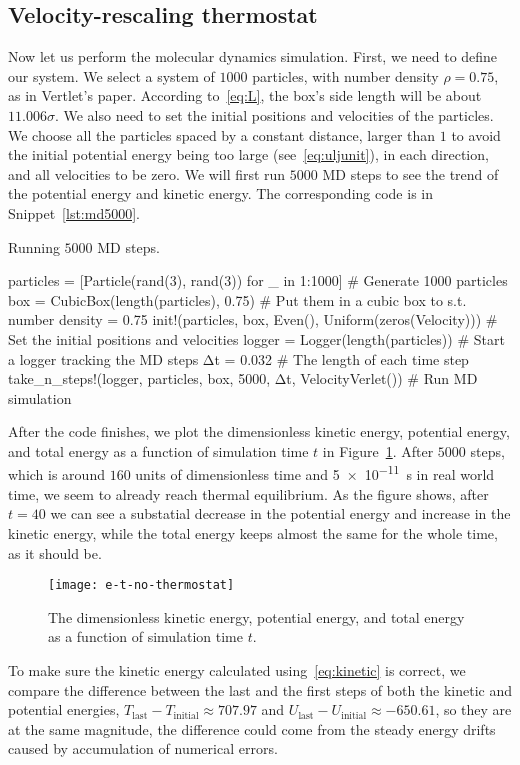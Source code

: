\subsection{Velocity-rescaling thermostat}

Now let us perform the molecular dynamics simulation.
First, we need to define our system. We select a system of $1000$ particles,
with number density $\rho = 0.75$, as in Vertlet\cite{Verlet}'s paper.
According to~\eqref{eq:L}, the box's side length will be about $11.006 \sigma$.
We also need to set the initial positions and velocities of the particles.
We choose all the particles spaced by a constant distance, larger than $1$
to avoid the initial potential energy being too large (see~\eqref{eq:uljunit}),
in each direction, and all velocities to be zero.
We will first run $5000$ MD steps to see the trend of the potential energy
and kinetic energy.
The corresponding code is in Snippet~\ref{lst:md5000}.
%
\begin{algorithm}
    \caption{Running $5000$ MD steps.}
    \label{lst:md5000}
    \begin{juliacode}
        particles = [Particle(rand(3), rand(3)) for _ in 1:1000]  # Generate 1000 particles
        box = CubicBox(length(particles), 0.75)  # Put them in a cubic box to s.t. number density = 0.75
        init!(particles, box, Even(), Uniform(zeros(Velocity)))  # Set the initial positions and velocities
        logger = Logger(length(particles))  # Start a logger tracking the MD steps
        Δt = 0.032  # The length of each time step
        take_n_steps!(logger, particles, box, 5000, Δt, VelocityVerlet())  # Run MD simulation
    \end{juliacode}
\end{algorithm}
%
After the code finishes, we plot the dimensionless kinetic energy, potential energy,
and total energy as a function of simulation time $t$ in Figure~\ref{fig:md5000}.
After $5000$ steps, which is around $160$ units of dimensionless time and
\qty{5e-11}{\second} in real world time, we seem to already reach thermal equilibrium.
As the figure shows, after $t = 40$ we can see a substatial decrease in the potential energy
and increase in the kinetic energy, while the total energy keeps almost the same for
the whole time, as it should be.
%
\begin{figure}
    \centering
    \texttt{[image: e-t-no-thermostat]}
    \caption{The dimensionless kinetic energy, potential energy, and total energy
        as a function of simulation time $t$.}
    \label{fig:md5000}
\end{figure}
%
To make sure the kinetic energy calculated using~\eqref{eq:kinetic} is correct, we compare
the difference between the last and the first steps of both the kinetic and potential
energies, $T_\text{last} - T_\text{initial} \approx 707.97$ and
$U_\text{last} - U_\text{initial} \approx -650.61$, so they are at the same magnitude,
the difference could come from the steady energy drifts caused by accumulation of
numerical errors.

